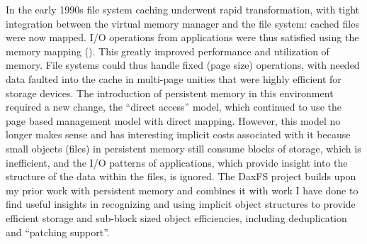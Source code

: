 In the early 1990s file system caching underwent rapid transformation, with
tight integration between the virtual memory manager and the file system: cached
files were now mapped.  I/O operations from applications were thus satisfied
using the memory mapping ().   This greatly improved performance and utilization of
memory.  File systems could thus handle fixed (page size) operations, with
needed data faulted into the cache in multi-page unities that were highly
efficient for storage devices.  The introduction of persistent memory  in this
environment required a new change, the “direct access” model, which continued to
use the page based management model with direct mapping.  However, this model no
longer makes sense and has interesting implicit costs associated with it because small
objects (files) in persistent memory still consume blocks of storage, which is
inefficient, and the I/O patterns of applications, which provide insight into
the structure of the data within the files, is ignored.  The DaxFS project
builds upon my prior work with persistent memory and combines it with work I
have done to find useful insights in recognizing and using implicit object
structures to provide efficient storage and sub-block sized object efficiencies,
including deduplication and “patching support”. 

